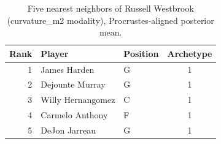 \begin{table}[htbp]
  \centering\small
  \begin{tabular}{rllc}
    \toprule
    Rank & Player & Position & Archetype \\
    \midrule
    1 & James Harden & G & 1 \\
    2 & Dejounte Murray & G & 1 \\
    3 & Willy Hernangomez & C & 1 \\
    4 & Carmelo Anthony & F & 1 \\
    5 & DeJon Jarreau & G & 1 \\
    \bottomrule
  \end{tabular}
  \caption{Five nearest neighbors of Russell Westbrook (curvature_m2 modality), Procrustes-aligned posterior mean.}
  \label{tab:Russell_Westbrook_neighbors_curvature_m2}
\end{table}

